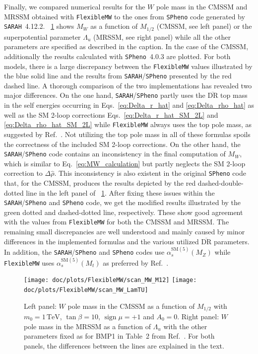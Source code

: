 \documentclass[final,3p,11pt,pdflatex]{elsarticle}
\makeatletter
\newcommand{\sarah}{\texttt{SARAH}\@\xspace}
\newcommand{\spheno}{\texttt{SPheno}\@\xspace}
\newcommand{\fmw}{\texttt{FlexibleMW}\@\xspace}
\newcommand{\ol}[1]{\overline{#1}}
\newcommand{\DRbar}{\ensuremath{\ol{\text{DR}}}\xspace}
\newcommand{\unit}[1]{\,\text{#1}}      %
\newcommand{\SM}{\ensuremath{\text{SM}}\xspace}
\newcommand{\figref}[1]{\figurename~\ref{#1}}
\newcommand{\azero}{\ensuremath{A_0}\xspace}
\newcommand{\mhalf}{\ensuremath{M_{1/2}}\xspace}
\newcommand{\mzero}{\ensuremath{m_0}\xspace}
\DeclareMathOperator{\sign}{sign}
\def\as{\alpha_s}
\makeatother
\begin{document}
Finally, we compared numerical results for the $W$ pole mass in the
CMSSM and MRSSM obtained with \fmw to the ones from \spheno code
generated by \sarah~4.12.2. \figref{fig:FlexibleMW_vs_SPheno} shows $M_W$
as a function of $\mhalf$ (CMSSM, see left panel) or the superpotential
parameter $\Lambda_u$ (MRSSM, see right panel) while all
the other parameters are specified as described in the caption.
In the case of the CMSSM, additionally the results calculated with
\spheno~4.0.3 are plotted. For both models, there is a large
discrepancy between the \fmw values illustrated by the blue solid
line and the results from \sarah/\spheno presented by the red dashed
line. A thorough comparison of the two implementations has revealed
two major differences. On the one hand, \sarah/\spheno partly uses the
\DRbar top mass in the self energies occurring in
Eqs.~\eqref{eq:Delta_r_hat} and \eqref{eq:Delta_rho_hat} as well as
the SM 2-loop corrections Eqs.~\eqref{eq:Delta_r_hat_SM_2L} and
\eqref{eq:Delta_rho_hat_SM_2L} while \fmw always uses the top pole mass,
as suggested by Ref.~\cite{Fanchiotti:1992tu}. Not utilizing the top
pole mass in all of these formulas spoils the correctness of the
included SM 2-loop corrections. On the other hand, the
\sarah/\spheno code contains an inconsistency in the final computation of
$M_W$, which is similar to Eq.~\eqref{eq:MW_calculation} but partly
neglects the SM 2-loop correction to $\Delta\hat\rho$.
This inconsistency is also existent in the original \spheno code that,
for the CMSSM, produces the results depicted by the red dashed-double-dotted
line in the left panel of \figref{fig:FlexibleMW_vs_SPheno}.
After fixing these issues within the \sarah/\spheno and \spheno code,
we get the modified results illustrated by the green dotted and
dashed-dotted line, respectively. These show good agreement with the
values from \fmw for both the CMSSM and MRSSM\@.
The remaining small discrepancies are well
understood and mainly caused by minor differences in the implemented
formulas and the various utilized \DRbar parameters. In addition,
the \sarah/\spheno and \spheno codes use $\as^{\SM(5)}(M_Z)$ while \fmw uses
$\as^{\SM(5)}(M_t)$ as preferred by Ref.~\cite{Fanchiotti:1992tu}.
%
\begin{figure}[tbh]
  \centering
  \texttt{[image: doc/plots/FlexibleMW/scan\_MW\_M12]}\hfill
  \texttt{[image: doc/plots/FlexibleMW/scan\_MW\_LamTU]}
  \caption{Left panel: $W$ pole mass in the CMSSM as a function of
  $\mhalf$ with $\mzero = 1\unit{TeV}$, $\tan\beta = 10$,
  $\sign\mu = +1$ and $\azero = 0$. Right panel: $W$ pole mass in
  the MRSSM as a function of $\Lambda_u$ with the other parameters
  fixed as for BMP1 in Table~2 from Ref.~\cite{Diessner:2014ksa}.
  For both panels, the differences between the lines are explained
  in the text.}
  \label{fig:FlexibleMW_vs_SPheno}
\end{figure}
%
\end{document}
